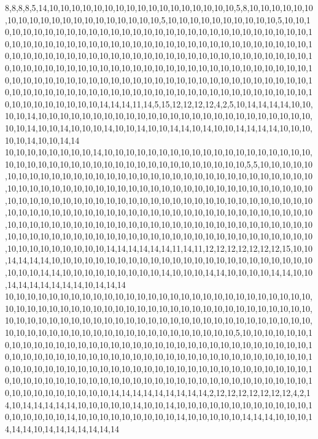 8,8,8,8,5,14,10,10,10,10,10,10,10,10,10,10,10,10,10,10,10,10,10,5,8,10,10,10,10,10,10,10,10,10,10,10,10,10,10,10,10,10,10,10,10,5,10,10,10,10,10,10,10,10,10,10,5,10,10,10,10,10,10,10,10,10,10,10,10,10,10,10,10,10,10,10,10,10,10,10,10,10,10,10,10,10,10,10,10,10,10,10,10,10,10,10,10,10,10,10,10,10,10,10,10,10,10,10,10,10,10,10,10,10,10,10,10,10,10,10,10,10,10,10,10,10,10,10,10,10,10,10,10,10,10,10,10,10,10,10,10,10,10,10,10,10,10,10,10,10,10,10,10,10,10,10,10,10,10,10,10,10,10,10,10,10,10,10,10,10,10,10,10,10,10,10,10,10,10,10,10,10,10,10,10,10,10,10,10,10,10,10,10,10,10,10,10,10,10,10,10,10,10,10,10,10,10,10,10,10,10,10,10,10,10,10,10,10,10,10,10,10,10,10,10,10,10,10,10,10,10,10,10,10,10,10,14,14,14,11,14,5,15,12,12,12,12,4,2,5,10,14,14,14,14,10,10,10,10,14,10,10,10,10,10,10,10,10,10,10,10,10,10,10,10,10,10,10,10,10,10,10,10,10,10,10,10,14,10,10,14,10,10,10,14,10,10,14,10,10,14,14,10,14,10,10,14,14,14,14,10,10,10,10,10,14,10,10,14,14
10,10,10,10,10,10,10,10,14,10,10,10,10,10,10,10,10,10,10,10,10,10,10,10,10,10,10,10,10,10,10,10,10,10,10,10,10,10,10,10,10,10,10,10,10,10,10,10,10,10,5,5,10,10,10,10,10,10,10,10,10,10,10,10,10,10,10,10,10,10,10,10,10,10,10,10,10,10,10,10,10,10,10,10,10,10,10,10,10,10,10,10,10,10,10,10,10,10,10,10,10,10,10,10,10,10,10,10,10,10,10,10,10,10,10,10,10,10,10,10,10,10,10,10,10,10,10,10,10,10,10,10,10,10,10,10,10,10,10,10,10,10,10,10,10,10,10,10,10,10,10,10,10,10,10,10,10,10,10,10,10,10,10,10,10,10,10,10,10,10,10,10,10,10,10,10,10,10,10,10,10,10,10,10,10,10,10,10,10,10,10,10,10,10,10,10,10,10,10,10,10,10,10,10,10,10,10,10,10,10,10,10,10,10,10,10,10,10,10,10,10,10,10,10,10,10,10,10,10,10,10,10,10,10,14,14,14,14,14,14,11,14,11,12,12,12,12,12,12,12,15,10,10,14,14,14,14,10,10,10,10,10,10,10,10,10,10,10,10,10,10,10,10,10,10,10,10,10,10,10,10,10,10,10,14,14,10,10,10,10,10,10,10,10,10,14,10,10,10,14,14,10,10,10,10,14,14,10,10,14,14,14,14,14,14,14,10,14,14,14
10,10,10,10,10,10,10,10,10,10,10,10,10,10,10,10,10,10,10,10,10,10,10,10,10,10,10,10,10,10,10,10,10,10,10,10,10,10,10,10,10,10,10,10,10,10,10,10,10,10,10,10,10,10,10,10,10,10,10,10,10,10,10,10,10,10,10,10,10,10,10,10,10,10,10,10,10,10,10,10,10,10,10,10,10,10,10,10,10,10,10,10,10,10,10,10,10,10,10,10,10,10,10,10,10,5,10,10,10,10,10,10,10,10,10,10,10,10,10,10,10,10,10,10,10,10,10,10,10,10,10,10,10,10,10,10,10,10,10,10,10,10,10,10,10,10,10,10,10,10,10,10,10,10,10,10,10,10,10,10,10,10,10,10,10,10,10,10,10,10,10,10,10,10,10,10,10,10,10,10,10,10,10,10,10,10,10,10,10,10,10,10,10,10,10,10,10,10,10,10,10,10,10,10,10,10,10,10,10,10,10,10,10,10,10,10,10,10,10,10,10,10,10,10,10,10,10,10,10,10,10,10,10,10,14,14,14,14,14,14,14,14,14,2,12,12,12,12,12,12,12,4,2,14,10,14,14,14,14,14,10,10,10,10,10,14,10,10,14,10,10,10,10,10,10,10,10,10,10,10,10,10,10,10,10,10,10,14,10,10,10,10,10,10,10,10,10,14,10,10,10,10,10,14,14,14,10,10,10,14,14,14,10,14,14,14,14,14,14,14
